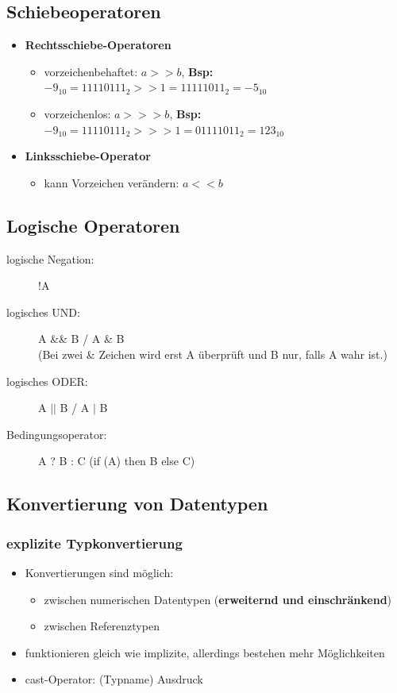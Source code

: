 \documentclass[a4paper,10pt]{article}
\newcommand{\Bold}[1]{\textbf{#1}} %
\begin{document}
\subsection{Schiebeoperatoren}
\begin{itemize}
	\item \Bold {Rechtsschiebe-Operatoren}
		\begin{itemize}
			\item vorzeichenbehaftet: $a >> b$, \Bold{Bsp:}$-9_{10} = 11110111_2 >> 1 = 11111011_2 = -5_{10}$
			\item vorzeichenlos: $a >>> b$, \Bold{Bsp:}$-9_{10} =  11110111_2 >>> 1 = 01111011_2 = 123_{10}$ 
		\end{itemize}
	\item \Bold {Linksschiebe-Operator}
		\begin{itemize}
			\item kann Vorzeichen ver\"andern:  $a << b$
		\end{itemize}
\end{itemize}

\subsection{Logische Operatoren}
\begin{description}
	\item[logische Negation:] !A
	\item[logisches UND:] A \&\& B  / A \& B \\
				(Bei zwei \& Zeichen wird erst A \"uberpr\"uft und B nur, falls A wahr ist.)
	\item[logisches ODER:] A $||$ B / A $|$ B
	\item[Bedingungsoperator:] A ? B : C (if (A) then B else C)
\end{description}

\subsection{Konvertierung von Datentypen}

\subsubsection{explizite Typkonvertierung}
\begin{itemize}
	\item Konvertierungen sind m\"oglich:
		\begin{itemize}
			\item zwischen numerischen Datentypen (\Bold {erweiternd und einschr\"ankend})
			\item zwischen Referenztypen
		\end{itemize}
	\item funktionieren gleich wie implizite, allerdings bestehen mehr M\"oglichkeiten
	\item cast-Operator: (Typname) Ausdruck
\end{itemize}
\end{document}
